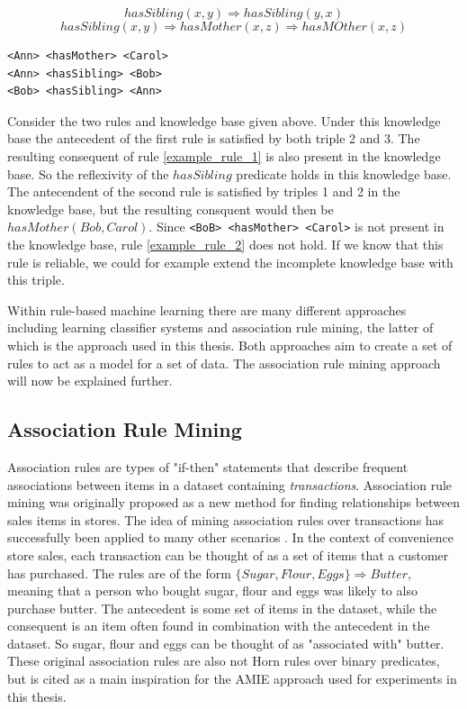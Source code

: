 \begin{equation}
hasSibling(x, y) \Rightarrow hasSibling(y,x)
\label{example_rule_1}
\end{equation}
\begin{equation}
    hasSibling(x, y) \Rightarrow hasMother(x,z) \Rightarrow hasMOther(x, z)
    \label{example_rule_2}
\end{equation}
\begin{lstlisting}[caption={Simple example knowledge base},captionpos=b, label={simple_kb_example}]
<Ann> <hasMother> <Carol>
<Ann> <hasSibling> <Bob>
<Bob> <hasSibling> <Ann>
\end{lstlisting}
Consider the two rules and knowledge base given above. Under this knowledge base the antecedent of the first rule is satisfied by both triple 2 and 3. The resulting consequent of rule \ref{example_rule_1} is also present in the knowledge base. So the reflexivity of the $hasSibling$ predicate holds in this knowledge base. The antecendent of the second rule is satisfied by triples 1 and 2 in the knowledge base, but the resulting consquent would then be $hasMother(Bob, Carol)$. Since \texttt{<BoB> <hasMother> <Carol>} is not present in the knowledge base, rule \ref{example_rule_2} does not hold. If we know that this rule is reliable, we could for example extend the incomplete knowledge base with this triple.

Within rule-based machine learning there are many different approaches including learning classifier systems\cite{sigaud2007learning} and association rule mining\cite{agrawal1993mining}, the latter of which is the approach used in this thesis. Both approaches aim to create a set of rules to act as a model for a set of data. The association rule mining approach will now be explained further.


\subsection{Association Rule Mining}
Association rules \cite{agrawal1993mining} are types of "if-then" statements that describe frequent associations between items in a dataset containing \textit{transactions}. Association rule mining was originally proposed as a new method for finding relationships between sales items in stores. The idea of mining association rules over transactions has successfully been applied to many other scenarios \cite{altaf2017applications, lin2002efficient}. In the context of convenience store sales, each transaction can be thought of as a set of items that a customer has purchased. The rules are of the form $\{Sugar, Flour, Eggs\} \Rightarrow Butter$, meaning that a person who bought sugar, flour and eggs was likely to also purchase butter. The antecedent is some set of items in the dataset, while the consequent is an item often found in combination with the antecedent in the dataset.  So sugar, flour and eggs can be thought of as "associated with" butter. These original association rules are also not Horn rules over binary predicates, but is cited as a main inspiration for the AMIE approach used for experiments in this thesis.

